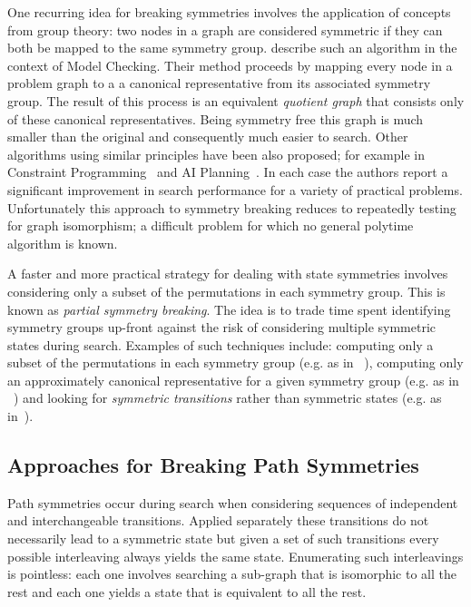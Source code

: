 One recurring idea for breaking symmetries involves the application of concepts from
group theory: two nodes in a graph are considered symmetric if they can both be mapped
to the same symmetry group. \cite{emerson96} describe such an algorithm in the context
of Model Checking. Their method proceeds by mapping every node in a problem graph to a
a canonical representative from its associated symmetry group. The result of this process
is an equivalent \emph{quotient graph} that consists only of these canonical representatives. 
Being symmetry free this graph is much smaller than the original and consequently much 
easier to search. Other algorithms using similar principles have been also proposed; for example
in Constraint Programming~\citep{crawford96,roney-dougal04} and AI Planning~\citep{pochter11}. 
In each case the authors report a significant improvement in search performance for a variety 
of practical problems.
Unfortunately this approach to symmetry breaking reduces to repeatedly testing for graph
isomorphism; a difficult problem for which no general polytime algorithm is known.

A faster and more practical strategy for dealing with state symmetries involves considering 
only a subset of the permutations in each symmetry group. This is known as 
\emph{partial symmetry breaking}. The idea is to trade time spent identifying symmetry 
groups up-front against the risk of considering multiple symmetric states during search.
Examples of such techniques include: computing only a subset of the permutations in each 
symmetry group (e.g. as in ~\citep{crawford96}), computing only an approximately canonical 
representative for a given symmetry group (e.g. as in ~\citep{pochter11}) and looking for 
\emph{symmetric transitions} rather than symmetric states 
(e.g. as in~\citep{fox99,fox02,rintannen03}).

\subsection{Approaches for Breaking Path Symmetries}
\label{cha::lit::symmetry::por}
Path symmetries occur during search when considering sequences of independent and interchangeable
transitions. Applied separately these transitions do not necessarily lead to a symmetric state but
given a set of such transitions every possible interleaving always yields the same state. 
Enumerating such interleavings is pointless: each one involves searching a sub-graph that is 
isomorphic to all the rest and each one yields a state that is equivalent to all the rest.

